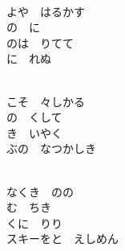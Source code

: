 \documentclass[10pt,b5j]{tarticle} %
\begin{document}
\vspace{1.5em} %
\newcommand{\linespace}{0.5em} %
\newcommand{\blocksize}{0.5\hsize} %
\newcommand{\itemmargin}{3em} %
\begin{enumerate} %
    \setlength{\itemindent}{\itemmargin} %
    \begin{minipage}[c]{\blocksize}
    
        \vspace{\linespace}
        \item~\\
        よや　はるかす\\
        の　に\\
        のは　りてて\\
        に　れぬ
        
    \end{minipage}
    \begin{minipage}[c]{\blocksize}
        
        \vspace{\linespace}
        \item~\\
        こそ　々しかる\\
        の　くして\\
        き　いやく\\
        ぶの　なつかしき
        
    \end{minipage}
    \begin{minipage}[c]{\blocksize}
        
        \vspace{\linespace}
        \item~\\
        なくき　のの\\
        む　ちき\\
        くに　りり\\
        スキーをと　えしめん
        

\end{minipage}
\end{enumerate}
\end{document}
